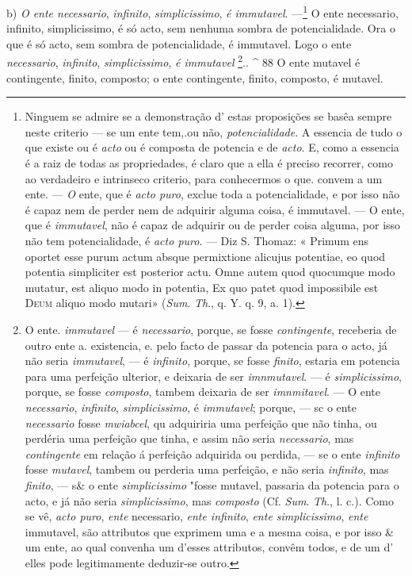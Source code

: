 b) \emph{O ente necessario}, \emph{infinito}, \emph{simplicissimo}, \emph{é immutavel}. ---\footnote{Ninguem se admire se a demonstração d' estas proposições se basêa sempre neste criterio --- se um ente tem,.ou não, \emph{potencialidade}. A essencia de tudo o que existe ou é \emph{acto} ou é composta de potencia e de \emph{acto}. E, como a essencia é a raiz de todas as propriedades, é claro que a ella é preciso recorrer, como ao verdadeiro e intrinseco criterio, para conhecermos o que. convem a um ente. --- \emph{O} ente, que é \emph{acto puro}, exclue toda a potencialidade, e por isso não é capaz nem de perder nem de adquirir alguma coisa, é immutavel. --- O ente, que é \emph{immutavel}, não é capaz de adquirir ou de perder coisa alguma, por isso não tem potencialidade, é \emph{acto puro}. --- Diz S. Thomaz: « Primum ens oportet esse purum actum absque permixtione alicujus potentiae, eo quod potentia simpliciter est posterior actu. Omne autem quod quocumque modo mutatur, est aliquo modo in potentia, Ex quo patet quod impossibile est \textsc{Deum} aliquo modo mutari» (\emph{Sum}. \emph{Th}., q. Y. q. 9, a. 1).}   O ente necessario, infinito, simplicissimo, é só acto, sem nenhuma sombra de potencialidade. Ora o que é só acto, sem sombra de potencialidade, é immutavel. Logo o ente \emph{necessario}, \emph{infinito}, \emph{simplicissimo}, \emph{é immutavel} \footnote{O ente. \emph{immutavel} --- é \emph{necessario}, porque, se fosse \emph{contingente}, receberia de outro ente a. existencia, e. pelo facto de passar da potencia para o acto, já não seria \emph{immutavel}, --- é \emph{infinito}, porque, se fosse \emph{finito}, estaria em potencia para uma perfeição ulterior, e deixaria de ser \emph{imnmutavel}. --- é \emph{simplicissimo}, porque, se fosse \emph{composto}, tambem deixaria de ser \emph{imnmitavel}. --- O ente \emph{necessario}, \emph{infinito}, \emph{simplicissimo}, é \emph{immutavel}; porque, --- sc o ente \emph{necessario} fosse \emph{mwiabcel}, qu adquiriria uma perfeição que não tinha, ou perdéria uma perfeição que tinha, e assim não seria \emph{necessario}, mas \emph{contingente} em relação á perfeição adquirida ou perdida, --- se o ente \emph{infinito} fosse \emph{mutavel}, tambem ou perderia uma perfeição, e não seria \emph{infinito}, mas \emph{finito}, --- s\& o ente \emph{simplicissimo} "fosse mutavel, passaria da potencia para o acto, e já não seria \emph{simplicissimo}, mas \emph{composto} (Cf. \emph{Sum}. \emph{Th}., l. c.). Como se vê, \emph{acto puro}, \emph{ente} necessario, \emph{ente infinito}, \emph{ente simplicissimo}, \emph{ente} immutavel, são attributos que exprimem uma e a mesma coisa, e por isso \& um ente, ao qual convenha um d'esses attributos, convêm todos, e de um d' elles pode legitimamente deduzir-se outro.}.. \textasciicircum{} 88 O ente mutavel é contingente, finito, composto; o ente contingente, finito, composto, é mutavel.

